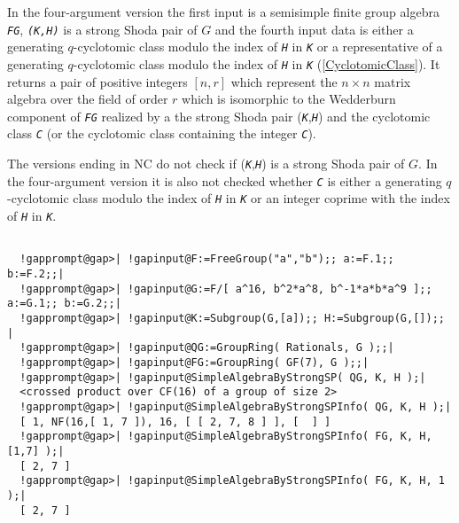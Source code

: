 \documentclass[a4paper,11pt]{report}
\begin{document}
{{{ In the four-argument version the first input is a semisimple finite group
algebra \mbox{\texttt{\mdseries\slshape FG}}, \mbox{\texttt{\mdseries\slshape (K,H)}} is a strong Shoda pair of $G$ and the fourth input data is either a generating $q$-cyclotomic class modulo the index of \mbox{\texttt{\mdseries\slshape H}} in \mbox{\texttt{\mdseries\slshape K}} or a representative of a generating $q$-cyclotomic class modulo the index of \mbox{\texttt{\mdseries\slshape H}} in \mbox{\texttt{\mdseries\slshape K}} (\ref{CyclotomicClass}). It returns a pair of positive integers $[n,r]$ which represent the $n\times n$ matrix algebra over the field of order $r$ which is isomorphic to the Wedderburn component of \mbox{\texttt{\mdseries\slshape FG}} realized by a the strong Shoda pair (\mbox{\texttt{\mdseries\slshape K}},\mbox{\texttt{\mdseries\slshape H}}) and the cyclotomic class \mbox{\texttt{\mdseries\slshape C}} (or the cyclotomic class containing the integer \mbox{\texttt{\mdseries\slshape C}}). 

 The versions ending in NC do not check if (\mbox{\texttt{\mdseries\slshape K}},\mbox{\texttt{\mdseries\slshape H}}) is a strong Shoda pair of $G$. In the four-argument version it is also not checked whether \mbox{\texttt{\mdseries\slshape C}} is either a generating $q$-cyclotomic class modulo the index of \mbox{\texttt{\mdseries\slshape H}} in \mbox{\texttt{\mdseries\slshape K}} or an integer coprime with the index of \mbox{\texttt{\mdseries\slshape H}} in \mbox{\texttt{\mdseries\slshape K}}. 
\begin{Verbatim}[commandchars=!@|,fontsize=\small,frame=single,label=Example]
  
  !gapprompt@gap>| !gapinput@F:=FreeGroup("a","b");; a:=F.1;; b:=F.2;;|
  !gapprompt@gap>| !gapinput@G:=F/[ a^16, b^2*a^8, b^-1*a*b*a^9 ];; a:=G.1;; b:=G.2;;|
  !gapprompt@gap>| !gapinput@K:=Subgroup(G,[a]);; H:=Subgroup(G,[]);; |
  !gapprompt@gap>| !gapinput@QG:=GroupRing( Rationals, G );;|
  !gapprompt@gap>| !gapinput@FG:=GroupRing( GF(7), G );;|
  !gapprompt@gap>| !gapinput@SimpleAlgebraByStrongSP( QG, K, H );|
  <crossed product over CF(16) of a group of size 2>
  !gapprompt@gap>| !gapinput@SimpleAlgebraByStrongSPInfo( QG, K, H );|
  [ 1, NF(16,[ 1, 7 ]), 16, [ [ 2, 7, 8 ] ], [  ] ]
  !gapprompt@gap>| !gapinput@SimpleAlgebraByStrongSPInfo( FG, K, H, [1,7] );|
  [ 2, 7 ]
  !gapprompt@gap>| !gapinput@SimpleAlgebraByStrongSPInfo( FG, K, H, 1 );|
  [ 2, 7 ]
  
\end{Verbatim}
 }

 }

 }
\end{document}
